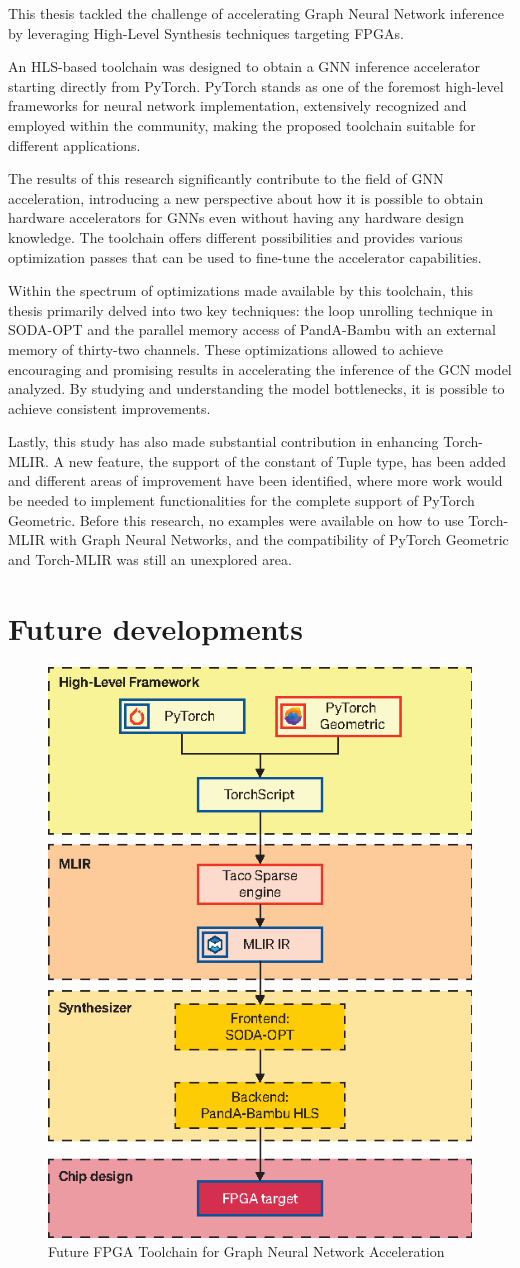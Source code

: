 This thesis tackled the challenge of accelerating Graph Neural Network inference by leveraging High-Level Synthesis techniques targeting FPGAs.

An HLS-based toolchain was designed to obtain a GNN inference accelerator starting directly from PyTorch.
PyTorch stands as one of the foremost high-level frameworks for neural network implementation, extensively recognized and employed within the community, making the proposed toolchain suitable for different applications.

The results of this research significantly contribute to the field of GNN acceleration, introducing a new perspective about how it is possible to obtain hardware accelerators for GNNs even without having any hardware design knowledge.
The toolchain offers different possibilities and provides various optimization passes that can be used to fine-tune the accelerator capabilities.

Within the spectrum of optimizations made available by this toolchain, this thesis primarily delved into two key techniques: the loop unrolling technique in SODA-OPT and the parallel memory access of PandA-Bambu with an external memory of thirty-two channels.
These optimizations allowed to achieve encouraging and promising results in accelerating the inference of the GCN model analyzed.
By studying and understanding the model bottlenecks, it is possible to achieve consistent improvements.

Lastly, this study has also made substantial contribution in enhancing Torch-MLIR\@.
A new feature, the support of the constant of Tuple type, has been added and different areas of improvement have been identified, where more work would be needed to implement functionalities for the complete support of PyTorch Geometric.
Before this research, no examples were available on how to use Torch-MLIR with Graph Neural Networks, and the compatibility of PyTorch Geometric and Torch-MLIR was still an unexplored area.

\section{Future developments}
\label{sec:future-dev}%

\begin{figure}[t]
    \centering
    \includegraphics[height=0.5\textwidth]{Images/toolchain_future}
    \caption{Future FPGA Toolchain for Graph Neural Network Acceleration}
    \label{fig:toolchain-future}
\end{figure}

